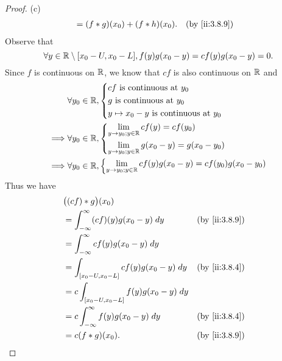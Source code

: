\begin{proof}{(c)}
\begin{align*}
     & = (f * g)(x_0) + (f * h)(x_0).                                                                           &  & \by{ii:3.8.9}
  \end{align*}
  Observe that
  \[
    \forall y \in \mathbb{R} \setminus [x_0 - U, x_0 - L], f(y) g(x_0 - y) = c f(y) g(x_0 - y) = 0.
  \]
  Since \(f\) is continuous on \(\mathbb{R}\), we know that \(cf\) is also continuous on \(\mathbb{R}\) and
  \begin{align*}
             & \forall y_0 \in \mathbb{R}, \begin{dcases}
                                     cf \text{ is continuous at } y_0 \\
                                     g \text{ is continuous at } y_0  \\
                                     y \mapsto x_0 - y \text{ is continuous at } y_0
                                   \end{dcases}                     \\
    \implies & \forall y_0 \in \mathbb{R}, \begin{dcases}
                                     \lim_{y \to y_0 ; y \in \mathbb{R}} cf(y) = cf(y_0) \\
                                     \lim_{y \to y_0 ; y \in \mathbb{R}} g(x_0 - y) = g(x_0 - y_0)
                                   \end{dcases}               \\
    \implies & \forall y_0 \in \mathbb{R}, \begin{dcases}
                                     \lim_{y \to y_0 ; y \in \mathbb{R}} cf(y) g(x_0 - y) = cf(y_0) g(x_0 - y_0)
                                   \end{dcases}
  \end{align*}
  Thus we have
  \begin{align*}
     & \big((cf) * g\big)(x_0)                                                \\
     & = \int_{-\infty}^\infty (cf)(y) g(x_0 - y) \; dy    &  & \by{ii:3.8.9} \\
     & = \int_{-\infty}^\infty c f(y) g(x_0 - y) \; dy                        \\
     & = \int_{[x_0 - U, x_0 - L]} c f(y) g(x_0 - y) \; dy &  & \by{ii:3.8.4} \\
     & = c \int_{[x_0 - U, x_0 - L]} f(y) g(x_0 - y) \; dy                    \\
     & = c \int_{-\infty}^\infty f(y) g(x_0 - y) \; dy     &  & \by{ii:3.8.4} \\
     & = c (f * g)(x_0).                                   &  & \by{ii:3.8.9}

\end{align*}
\end{proof}

